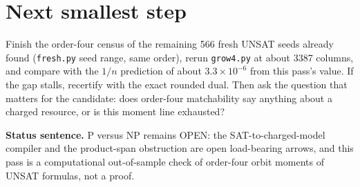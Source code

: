 \documentclass[11pt]{article}
\begin{document}
\section*{Next smallest step}
Finish the order-four census of the remaining 566 fresh UNSAT seeds already found (\texttt{fresh.py} seed range, same order), rerun \texttt{grow4.py} at about 3387 columns, and compare with the $1/n$ prediction of about $3.3\times10^{-6}$ from this pass's value. If the gap stalls, recertify with the exact rounded dual. Then ask the question that matters for the candidate: does order-four matchability say anything about a charged resource, or is this moment line exhausted?

\bigskip
\noindent\textbf{Status sentence.} P versus NP remains OPEN: the SAT-to-charged-model compiler and the product-span obstruction are open load-bearing arrows, and this pass is a computational out-of-sample check of order-four orbit moments of UNSAT formulas, not a proof.
\end{document}
